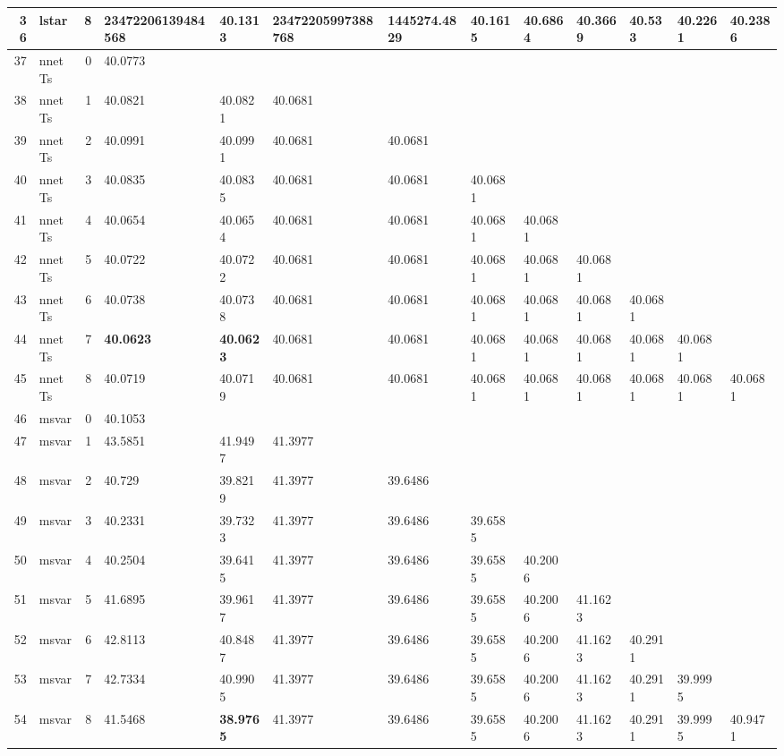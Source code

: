 \documentclass[10pt,a4paper]{article}
\begin{document}
\begin{table}[ht]
\begin{tabular}{rlrllllllllll}
  36 & lstar &     8 & 23472206139484568 & 40.1313 & 23472205997388768 & 1445274.4829 & 40.1615 & 40.6864 & 40.3669 & 40.533 & 40.2261 & 40.2386 \\ 
   \hline
37 & nnetTs &     0 & 40.0773 &  &  &  &  &  &  &  &  &  \\ 
  38 & nnetTs &     1 & 40.0821 & 40.0821 & 40.0681 &  &  &  &  &  &  &  \\ 
  39 & nnetTs &     2 & 40.0991 & 40.0991 & 40.0681 & 40.0681 &  &  &  &  &  &  \\ 
  40 & nnetTs &     3 & 40.0835 & 40.0835 & 40.0681 & 40.0681 & 40.0681 &  &  &  &  &  \\ 
  41 & nnetTs &     4 & 40.0654 & 40.0654 & 40.0681 & 40.0681 & 40.0681 & 40.0681 &  &  &  &  \\ 
  42 & nnetTs &     5 & 40.0722 & 40.0722 & 40.0681 & 40.0681 & 40.0681 & 40.0681 & 40.0681 &  &  &  \\ 
  43 & nnetTs &     6 & 40.0738 & 40.0738 & 40.0681 & 40.0681 & 40.0681 & 40.0681 & 40.0681 & 40.0681 &  &  \\ 
  44 & nnetTs &     7 & \textbf{40.0623} & \textbf{40.0623} & 40.0681 & 40.0681 & 40.0681 & 40.0681 & 40.0681 & 40.0681 & 40.0681 &  \\ 
  45 & nnetTs &     8 & 40.0719 & 40.0719 & 40.0681 & 40.0681 & 40.0681 & 40.0681 & 40.0681 & 40.0681 & 40.0681 & 40.0681 \\ 
   \hline
46 & msvar &     0 & 40.1053 &  &  &  &  &  &  &  &  &  \\ 
  47 & msvar &     1 & 43.5851 & 41.9497 & 41.3977 &  &  &  &  &  &  &  \\ 
  48 & msvar &     2 & 40.729 & 39.8219 & 41.3977 & 39.6486 &  &  &  &  &  &  \\ 
  49 & msvar &     3 & 40.2331 & 39.7323 & 41.3977 & 39.6486 & 39.6585 &  &  &  &  &  \\ 
  50 & msvar &     4 & 40.2504 & 39.6415 & 41.3977 & 39.6486 & 39.6585 & 40.2006 &  &  &  &  \\ 
  51 & msvar &     5 & 41.6895 & 39.9617 & 41.3977 & 39.6486 & 39.6585 & 40.2006 & 41.1623 &  &  &  \\ 
  52 & msvar &     6 & 42.8113 & 40.8487 & 41.3977 & 39.6486 & 39.6585 & 40.2006 & 41.1623 & 40.2911 &  &  \\ 
  53 & msvar &     7 & 42.7334 & 40.9905 & 41.3977 & 39.6486 & 39.6585 & 40.2006 & 41.1623 & 40.2911 & 39.9995 &  \\ 
  54 & msvar &     8 & 41.5468 & \textbf{38.9765} & 41.3977 & 39.6486 & 39.6585 & 40.2006 & 41.1623 & 40.2911 & 39.9995 & 40.9471 \\ 

\end{tabular}
\end{table}
\end{document}
